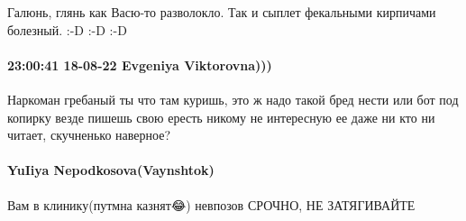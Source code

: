 Галюнь, глянь как Васю-то разволокло. Так и сыплет фекальными кирпичами
болезный. :-D :-D :-D

\paragraph{23:00:41 18-08-22 Evgeniya Viktorovna)))}

Наркоман гребаный ты что там куришь, это ж надо такой бред нести или бот под
копирку везде пишешь свою ересть никому не интересную ее даже ни кто ни читает,
скучненько наверное?

\paragraph{YuIiya Nepodkosova(Vaynshtok)}

Вам в клинику(путмна казнят😂) невпозов СРОЧНО, НЕ ЗАТЯГИВАЙТЕ
